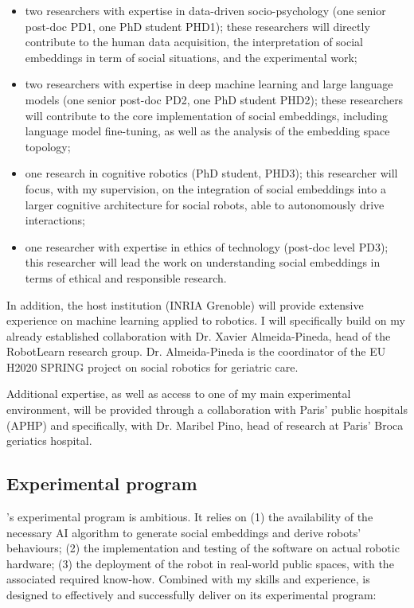 \begin{itemize}

    \item  two researchers with expertise in data-driven
        socio-psychology (one senior post-doc PD1, one PhD student PHD1); these
        researchers will directly contribute to the human data acquisition,
        the interpretation of social embeddings in term of social situations,
        and the experimental work;

    \item two researchers with expertise in deep machine learning and large
        language models (one senior post-doc PD2, one PhD student PHD2); these
        researchers will contribute to the core implementation of social
        embeddings, including language model fine-tuning, as well as the
        analysis of the embedding space topology;

    \item one research in cognitive robotics (PhD student, PHD3); this
        researcher will focus, with my supervision, on the integration of social
        embeddings into a larger cognitive architecture for social robots, able
        to autonomously drive interactions;

    \item one researcher with expertise in ethics of technology (post-doc
        level PD3); this researcher will lead the work on understanding social
        embeddings in terms of ethical and responsible research.
\end{itemize}

In addition, the host institution (INRIA Grenoble) will provide extensive
experience on machine learning applied to robotics. I will specifically build on
my already established collaboration with Dr. Xavier Almeida-Pineda, head of the
RobotLearn research group. Dr. Almeida-Pineda is the coordinator of the EU H2020
SPRING project on social robotics for geriatric care.

Additional expertise, as well as access to one of my main experimental
environment, will be provided through a collaboration with Paris' public
hospitals (APHP) and specifically, with Dr. Maribel Pino, head of research at
Paris' Broca geriatics hospital.

\subsection{Experimental program}

\project's experimental program is ambitious. It relies on (1) the availability
of the necessary AI algorithm to generate social embeddings and derive robots'
behaviours; (2) the implementation and testing of the software on actual
robotic hardware; (3) the deployment of the robot in real-world public spaces,
with the associated required know-how. Combined with my skills and
experience, \project is designed to effectively and successfully
deliver on its experimental program:

